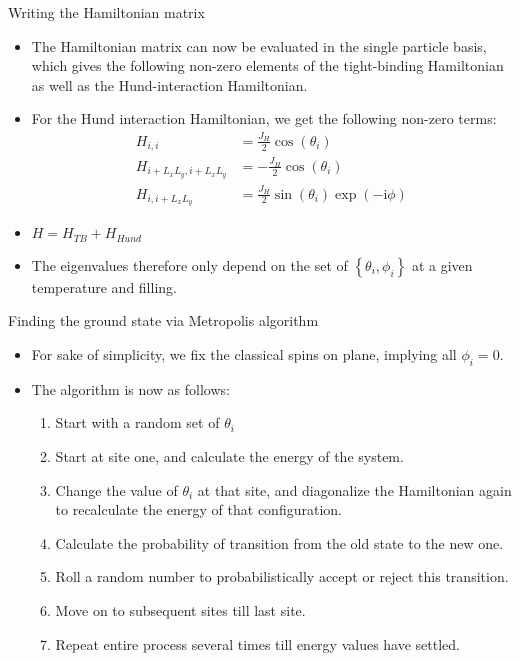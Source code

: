 \documentclass[]{beamer}
\newcommand{\I}{\mathrm{i}}
\begin{document}
\begin{frame}{Writing the Hamiltonian matrix}
\begin{itemize}
	\item The Hamiltonian matrix can now be evaluated in the single particle basis, which gives the following non-zero elements of the tight-binding Hamiltonian as well as the Hund-interaction Hamiltonian.
	\item For the Hund interaction Hamiltonian, we get the following non-zero terms:
	\begin{subequations}
	\begin{align}
	H_{i,i} &= \frac{J_H}{2} \cos(\theta_i)\\
	H_{i + L_x L_y,i + L_x L_y} &= -\frac{J_H}{2} \cos(\theta_i)\\
	H_{i, i+ L_x L_y} &= \frac{J_H}{2} \sin(\theta_i) \exp(- \I \phi)
	\end{align}
	\end{subequations}
\item $ H = H_{TB} + H_{Hund} $
\item The eigenvalues therefore only depend on the set of $ \left \{ \theta_i, \phi_i \right \} $ at a given temperature and filling.
\end{itemize}
\end{frame}

\begin{frame}{Finding the ground state via Metropolis algorithm}
\begin{itemize}
	\item For sake of simplicity, we fix the classical spins on plane, implying all $ \phi_i=0 $.
	\item The algorithm is now as follows:
	\begin{enumerate}
		\item Start with a random set of $ \theta_i $
		\item Start at site one, and calculate the energy of the system.
		\item Change the value of $ \theta_i $ at that site, and diagonalize the Hamiltonian again to recalculate the energy of that configuration.
		\item Calculate the probability of transition from the old state to the new one.
		\item Roll a random number to probabilistically accept or reject this transition.
		\item Move on to subsequent sites till last site.
		\item Repeat entire process several times till energy values have settled.
	\end{enumerate}
\end{itemize}
\end{frame}
\end{document}
